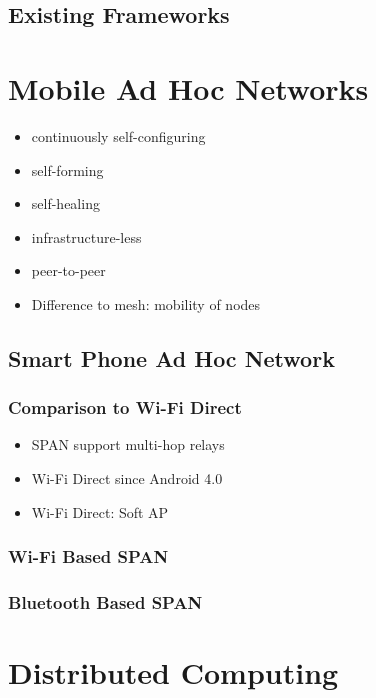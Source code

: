 		\subsection*{Existing Frameworks}
	
	\section{Mobile Ad Hoc Networks}
	
	{\color{gray} 
		\begin{itemize}  
			\item continuously self-configuring
			\item self-forming
			\item self-healing
			\item infrastructure-less
			\item peer-to-peer
			\item Difference to mesh: mobility of nodes
		\end{itemize}
	}
	
		\subsection*{Smart Phone Ad Hoc Network}
		
			\subsubsection*{Comparison to Wi-Fi Direct}
			
			{\color{gray} 
				\begin{itemize}  
					\item SPAN support multi-hop relays
					\item Wi-Fi Direct since Android 4.0
					\item Wi-Fi Direct: Soft AP 
				\end{itemize}
			}
		
			\subsubsection*{Wi-Fi Based \gls{SPAN}}
	
			\subsubsection*{Bluetooth Based \gls{SPAN}}
			
	\section{Distributed Computing}
	
